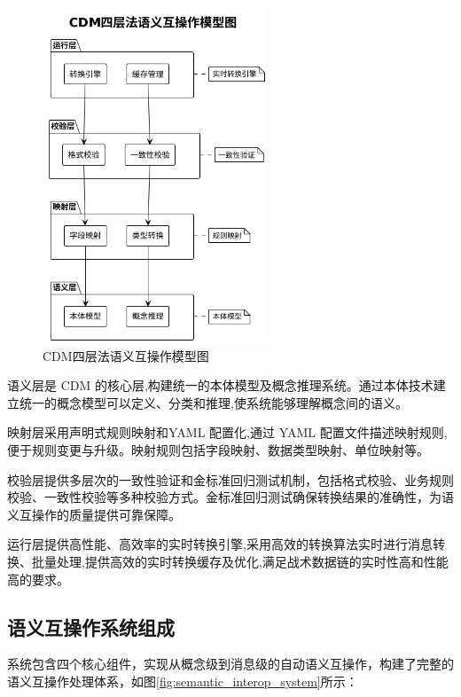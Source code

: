 \begin{figure}[H]
    \centering
    \includegraphics[width=0.6\textwidth,height=0.5\textheight]{chapters/fig-0/cdm_four_layer_simple.png}
    \caption{CDM四层法语义互操作模型图}
    \label{fig:cdm_four_layer}
\end{figure}

语义层是 CDM 的核心层,构建统一的本体模型及概念推理系统。通过本体技术建立统一的概念模型可以定义、分类和推理,使系统能够理解概念间的语义。

映射层采用声明式规则映射和YAML 配置化,通过 YAML 配置文件描述映射规则,便于规则变更与升级。映射规则包括字段映射、数据类型映射、单位映射等。

校验层提供多层次的一致性验证和金标准回归测试机制，包括格式校验、业务规则校验、一致性校验等多种校验方式。金标准回归测试确保转换结果的准确性，为语义互操作的质量提供可靠保障。

运行层提供高性能、高效率的实时转换引擎,采用高效的转换算法实时进行消息转换、批量处理,提供高效的实时转换缓存及优化,满足战术数据链的实时性高和性能高的要求。

\subsection{语义互操作系统组成}

系统包含四个核心组件，实现从概念级到消息级的自动语义互操作，构建了完整的语义互操作处理体系，如图\ref{fig:semantic_interop_system}所示：

